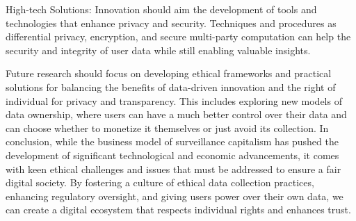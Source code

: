 High-tech Solutions: Innovation should aim the development of tools and technologies that enhance privacy and security.
Techniques and procedures as differential privacy, encryption, and secure multi-party computation can help the security and integrity of user data while still enabling valuable insights.

Future research should focus on developing ethical frameworks and practical solutions for balancing the benefits of data-driven innovation and the right of individual for privacy and transparency.
This includes exploring new models of data ownership, where users can have a much better control over their data and can choose whether to monetize it themselves or just avoid its collection.
In conclusion, while the business model of surveillance capitalism has pushed the development of significant technological and economic advancements, it comes with keen ethical challenges and issues that must be addressed to ensure a fair digital society.
By fostering a culture of ethical data collection practices, enhancing regulatory oversight, and giving users power over their own data, we can create a digital ecosystem that respects individual rights and enhances trust.
\noindent
